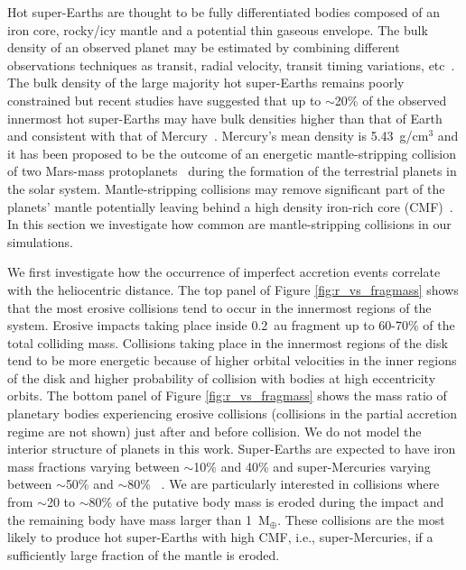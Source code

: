 \documentclass[fleqn,usenatbib]{mnras}
\begin{document}
Hot super-Earths are thought to be fully differentiated bodies composed of an iron core, rocky/icy mantle and a potential thin gaseous envelope. The bulk density of an observed planet may be estimated by combining different observations techniques as transit, radial velocity, transit timing variations, etc~\citep[e.g.][]{weissmarcy14,haddenlithwick17}. The bulk density of the large majority hot super-Earths remains poorly constrained but recent studies have suggested that up to $\sim$20\% of the observed innermost hot super-Earths may have bulk densities higher than that of Earth and consistent with that of Mercury~\citep{adibekyanetal21,schulzeetal21}. Mercury's mean density is 5.43~g/cm$^3$ and it has been proposed to be the outcome of an energetic mantle-stripping collision of two Mars-mass protoplanets~\citep{asphaugreufer14} during the formation of the terrestrial planets in the solar system. Mantle-stripping collisions may remove significant part of the planets' mantle potentially leaving behind a high density iron-rich core (CMF)~\citep{marcusetal09,asphaugreufer14}. In this section we investigate how common are mantle-stripping collisions  in our simulations. 

We first investigate how the occurrence of imperfect accretion events correlate with the heliocentric distance. The top panel of Figure \ref{fig:r_vs_fragmass} shows that the most erosive collisions tend to occur in the innermost regions of the system. Erosive impacts taking place inside 0.2~au fragment up to 60-70\% of the total colliding mass. Collisions taking place in the innermost regions of the disk tend to be more energetic because of higher orbital velocities in the inner regions of the disk and higher probability of collision with bodies at high eccentricity orbits. The bottom panel of Figure \ref{fig:r_vs_fragmass} shows the mass ratio of planetary bodies experiencing erosive collisions (collisions in the partial accretion regime are not shown) just after and before collision. We do not model the interior structure of planets in this work. Super-Earths are expected to have iron mass fractions varying between $\sim$10\% and 40\% and super-Mercuries varying between $\sim$50\% and $\sim$80\%~ \citep{adibekyanetal21}. We are particularly interested in collisions where from $\sim$20 to $\sim$80\% of the putative body mass is eroded during the impact and the remaining body have mass larger than 1~M$_{\oplus}$.  These collisions are the most likely to produce hot super-Earths with high CMF, i.e., super-Mercuries, if a sufficiently large fraction of the mantle is eroded.
\end{document}
